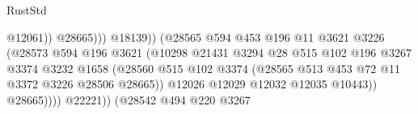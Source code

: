 \begin{lexlean}{RustStd}
\begin{coremodule}
                                                        @12061))
                                                    @28665)))
                                              @18139))
                                          (@28565
                                            @594
                                            @453
                                            @196
                                            @11
                                            @3621
                                            @3226
                                            (@28573
                                              @594
                                              @196
                                              @3621
                                              (@10298
                                                @21431
                                                @3294
                                                @28
                                                @515
                                                @102
                                                @196
                                                @3267
                                                @3374
                                                @3232
                                                @1658
                                                (@28560
                                                  @515
                                                  @102
                                                  @3374
                                                  (@28565
                                                    @513
                                                    @453
                                                    @72
                                                    @11
                                                    @3372
                                                    @3226
                                                    @28506
                                                    @28665))
                                                @12026
                                                @12029
                                                @12032
                                                @12035
                                                @10443))
                                            @28665))))
                                    @22221))
                                (@28542
                                  @494
                                  @220
                                  @3267

\end{coremodule}
\end{lexlean}
